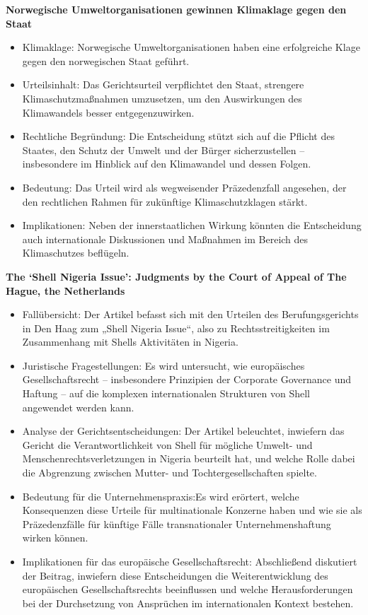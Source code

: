 \documentclass[a4paper, 12pt]{article} %
\begin{document}
 \textbf{\cite{businessportalnorwegenNorwegischeUmweltorganisationenGewinnen2024} Norwegische Umweltorganisationen gewinnen Klimaklage gegen den Staat}
 \begin{itemize}
    \item Klimaklage: Norwegische Umweltorganisationen haben eine erfolgreiche Klage gegen den norwegischen Staat geführt.
    \item Urteilsinhalt: Das Gerichtsurteil verpflichtet den Staat, strengere Klimaschutzmaßnahmen umzusetzen, um den Auswirkungen des Klimawandels besser entgegenzuwirken.
    \item Rechtliche Begründung: Die Entscheidung stützt sich auf die Pflicht des Staates, den Schutz der Umwelt und der Bürger sicherzustellen – insbesondere im Hinblick auf den Klimawandel und dessen Folgen.
    \item Bedeutung: Das Urteil wird als wegweisender Präzedenzfall angesehen, der den rechtlichen Rahmen für zukünftige Klimaschutzklagen stärkt.
    \item Implikationen: Neben der innerstaatlichen Wirkung könnten die Entscheidung auch internationale Diskussionen und Maßnahmen im Bereich des Klimaschutzes beflügeln.
 \end{itemize}

 \textbf{\cite{de2016shell} The ‘{{Shell}} Nigeria Issue’: Judgments by the Court of Appeal of {{The Hague}}, the {{Netherlands}}}

 \begin{itemize}
    \item Fallübersicht: Der Artikel befasst sich mit den Urteilen des Berufungsgerichts in Den Haag zum „Shell Nigeria Issue“, also zu Rechtsstreitigkeiten im Zusammenhang mit Shells Aktivitäten in Nigeria.
    \item Juristische Fragestellungen: Es wird untersucht, wie europäisches Gesellschaftsrecht – insbesondere Prinzipien der Corporate Governance und Haftung – auf die komplexen internationalen Strukturen von Shell angewendet werden kann.
    \item Analyse der Gerichtsentscheidungen: Der Artikel beleuchtet, inwiefern das Gericht die Verantwortlichkeit von Shell für mögliche Umwelt- und Menschenrechtsverletzungen in Nigeria beurteilt hat, und welche Rolle dabei die Abgrenzung zwischen Mutter- und Tochtergesellschaften spielte.
    \item Bedeutung für die Unternehmenspraxis:Es wird erörtert, welche Konsequenzen diese Urteile für multinationale Konzerne haben und wie sie als Präzedenzfälle für künftige Fälle transnationaler Unternehmenshaftung wirken können.
    \item Implikationen für das europäische Gesellschaftsrecht: Abschließend diskutiert der Beitrag, inwiefern diese Entscheidungen die Weiterentwicklung des europäischen Gesellschaftsrechts beeinflussen und welche Herausforderungen bei der Durchsetzung von Ansprüchen im internationalen Kontext bestehen.
 \end{itemize}
\end{document}
